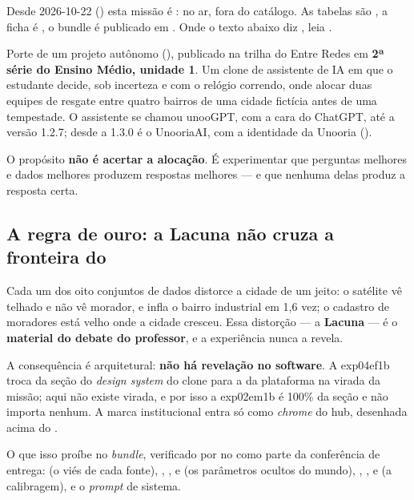 \begin{atencao}
Desde 2026-10-22 () esta missão é : no ar, fora
do catálogo. As tabelas são , a ficha é
, o bundle é publicado em
. Onde o texto abaixo diz , leia
.
\end{atencao}

Porte de um projeto autônomo (), publicado na trilha do Entre Redes
em \textbf{2ª série do Ensino Médio, unidade 1}. Um clone de assistente de IA em
que o estudante decide, sob incerteza e com o relógio correndo, onde alocar duas
equipes de resgate entre quatro bairros de uma cidade fictícia antes de uma
tempestade. O assistente se chamou unooGPT, com a cara do ChatGPT, até a
versão 1.2.7; desde a 1.3.0 é o UnooriaAI, com a identidade da Unooria
().

\begin{destaque}
O propósito \textbf{não é acertar a alocação}. É experimentar que perguntas
melhores e dados melhores produzem respostas melhores --- e que nenhuma delas
produz a resposta certa.
\end{destaque}

\subsection{A regra de ouro: a Lacuna não cruza a fronteira do }

Cada um dos oito conjuntos de dados distorce a cidade de um jeito: o satélite vê
telhado e não vê morador, e infla o bairro industrial em 1,6 vez; o cadastro de
moradores está velho onde a cidade cresceu. Essa distorção --- a
\textbf{Lacuna} --- é o \textbf{material do debate do professor}, e a experiência
nunca a revela.

A consequência é arquitetural: \textbf{não há revelação no software}. A exp04ef1b
troca da seção do \emph{design system} do clone para a da plataforma na virada da
missão; aqui não existe virada, e por isso a exp02em1b é 100\% da seção
 e não importa  nenhum. A marca institucional entra
só como \emph{chrome} do hub, desenhada acima do .

O que isso proíbe no \emph{bundle}, verificado por  no  como
parte da conferência de entrega:  (o viés de cada fonte),
, ,  e
 (os parâmetros ocultos do mundo),
, ,  e
 (a calibragem), e o \emph{prompt} de sistema.

